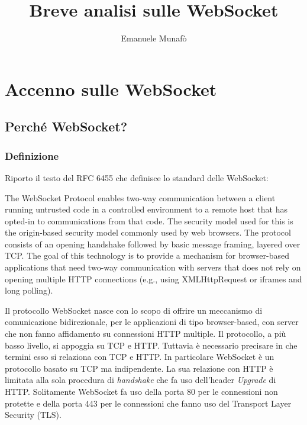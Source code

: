 \documentclass[
  oneside,
  11pt, a4paper,
  footinclude=true,
  headinclude=true,
  cleardoublepage=empty
]{scrbook}
\title{Breve analisi sulle WebSocket}
\author{Emanuele Munafò}
\begin{document}
\maketitle




\part{Accenno sulle WebSocket}

\chapter{Perché WebSocket?}


\section{Definizione}
Riporto il testo del RFC 6455 che definisce lo standard delle WebSocket:
\begin{displayquote}
The WebSocket Protocol enables two-way communication between a client
running untrusted code in a controlled environment to a remote host
that has opted-in to communications from that code.  The security
model used for this is the origin-based security model commonly used
by web browsers.  The protocol consists of an opening handshake
followed by basic message framing, layered over TCP.  The goal of
this technology is to provide a mechanism for browser-based
applications that need two-way communication with servers that does
not rely on opening multiple HTTP connections (e.g., using
XMLHttpRequest or iframes and long polling).
\end{displayquote}
Il protocollo WebSocket nasce con lo scopo di offrire un meccanismo di comunicazione bidirezionale, per le applicazioni di tipo browser-based, con server che non fanno affidamento su connessioni HTTP multiple.
Il protocollo, a più basso livello, si appoggia su TCP e HTTP.
Tuttavia è necessario precisare in che termini esso si relaziona con TCP e HTTP.
In particolare WebSocket è un protocollo basato su TCP ma indipendente. La sua relazione con HTTP è limitata alla sola procedura di \textit{handshake} che fa uso dell'header \textit{Upgrade} di HTTP.
Solitamente WebSocket fa uso della porta 80 per le connessioni non protette e della porta 443 per le connessioni che fanno uso del Transport Layer Security (TLS).
\end{document}
